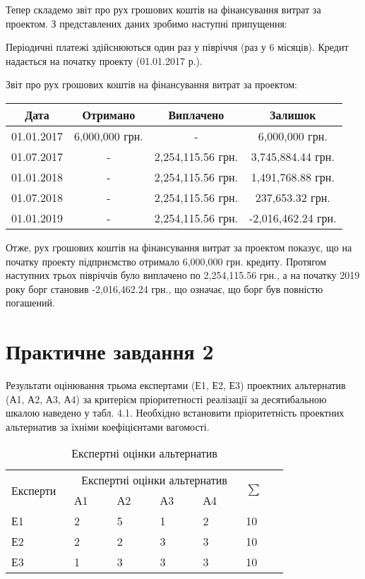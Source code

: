 \documentclass[oneside,14pt]{extarticle}
\begin{document}
Тепер складемо звіт про рух грошових коштів на фінансування витрат за проектом. З представлених даних зробимо наступні припущення:

Періодичні платежі здійснюються один раз у півріччя (раз у 6 місяців).
Кредит надається на початку проекту (01.01.2017 р.).

Звіт про рух грошових коштів на фінансування витрат за проектом:

\begin{table}[H]
	\centering
	\begin{tabular}{|c|c|c|c|}
		\hline
		Дата & Отримано & Виплачено & Залишок \\
		\hline
		01.01.2017 & 6,000,000 грн. & - & 6,000,000 грн. \\
		\hline
		01.07.2017 & - & 2,254,115.56 грн. & 3,745,884.44 грн. \\
		\hline
		01.01.2018 & - & 2,254,115.56 грн. & 1,491,768.88 грн. \\
		\hline
		01.07.2018 & - & 2,254,115.56 грн. & 237,653.32 грн. \\
		\hline
		01.01.2019 & - & 2,254,115.56 грн. & -2,016,462.24 грн. \\
		\hline
	\end{tabular}
\end{table}

Отже, рух грошових коштів на фінансування витрат за проектом показує, що на початку проекту підприємство отримало 6,000,000 грн. кредиту. Протягом наступних трьох півріччів було виплачено по 2,254,115.56 грн., а на початку 2019 року борг становив -2,016,462.24 грн., що означає, що борг був повністю погашений.

\newpage
\section*{Практичне завдання 2}

Результати оцінювання трьома експертами (Е1, Е2, Е3) проектних альтернатив (А1, А2, А3, А4) за критерієм пріоритетності реалізації за десятибальною шкалою наведено у табл. 4.1. Необхідно встановити пріоритетність проектних альтернатив за їхніми коефіцієнтами вагомості.

	\begin{table}[H]
		\centering
		\caption{Експертні оцінки альтернатив}
		\begin{tabular}{|p{0.13\linewidth}|p{0.13\linewidth}|p{0.13\linewidth}|p{0.13\linewidth}|p{0.13\linewidth}|p{0.13\linewidth}|}
			\hline
			\multirow{2}{*}{Експерти} & \multicolumn{4}{c|}{Експертні оцінки альтернатив} & \multirow{2}{*}{$\sum$} \\
			\cline{2-5}
			& А1 & А2 & А3 & А4 & \\
			\hline
			Е1 & 2 & 5 & 1 & 2 & 10 \\
			\hline
			Е2 & 2 & 2 & 3 & 3 & 10 \\
			\hline
			Е3 & 1 & 3 & 3 & 3 & 10 \\
			\hline
		\end{tabular}
	\end{table}
	
\end{document}
